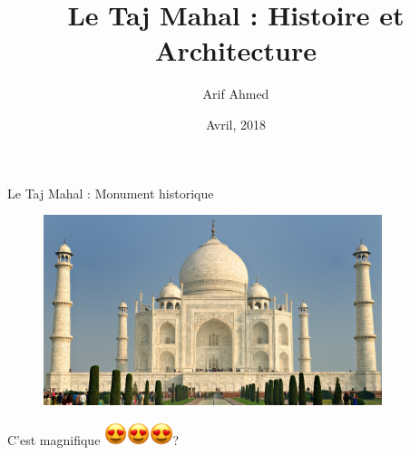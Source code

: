 \documentclass{beamer}
\title{Le Taj Mahal : Histoire et Architecture}
\author{Arif Ahmed  }
\institute[Université Rennes 2] %
{
   CIREFE Soutien Linguistique - A1 \\
  Université Rennes 2 }
\date{Avril, 2018}
\begin{document}
\begin{frame}
  \titlepage
\end{frame}

\begin{frame}{Le Taj Mahal :   Monument historique}


\begin{figure}[h]
    \includegraphics[width=0.88\textwidth]{Taj-Mahal-Grand.jpg}
\end{figure}
\begin{center}
\LARGE C'est magnifique    \includegraphics[width=0.05\textwidth]{smiling-face-with-heart-eyes.png}\includegraphics[width=0.05\textwidth]{smiling-face-with-heart-eyes.png}\includegraphics[width=0.05\textwidth]{smiling-face-with-heart-eyes.png}?
\end{center}
\end{frame}
\end{document}
